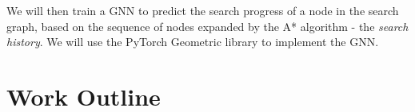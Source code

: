 \documentclass[11pt]{article}
\begin{document}
We will then train a GNN to predict the search progress of a node in the search graph, based on the sequence of nodes expanded by the A* algorithm - the \textit{search history}.
We will use the PyTorch Geometric library to implement the GNN.



\section{Work Outline}



\end{document}
